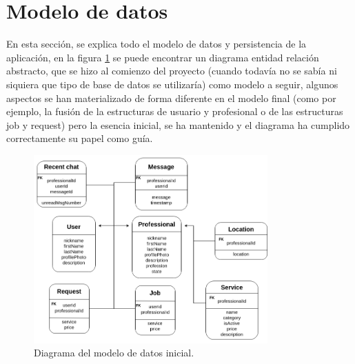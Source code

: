 \section{Modelo de datos}
\label{sec:modeloDatos}
En esta sección, se explica todo el modelo de datos y persistencia de la aplicación, en la figura \ref{fig:er_inicial} se puede encontrar un diagrama entidad relación abstracto, que se hizo al comienzo del proyecto (cuando todavía no se sabía ni siquiera que tipo de base de datos se utilizaría) como modelo a seguir, algunos aspectos se han materializado de forma diferente en el modelo final (como por ejemplo, la fusión de la estructuras de usuario y profesional o de las estructuras job y request) pero la esencia inicial, se ha mantenido y el diagrama ha cumplido correctamente su papel como guía.
\begin{figure}[h]
    \centering
    \includegraphics[width = 0.8\textwidth]{Imagenes/drawio/modelo_datos_inicial.png}
    \caption{Diagrama del modelo de datos inicial.}
    \label{fig:er_inicial}
\end{figure}
